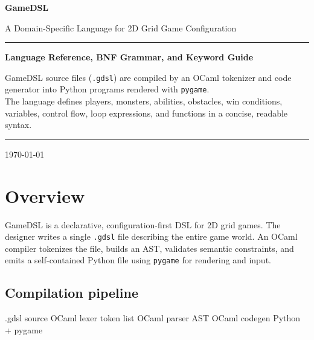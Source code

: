 \documentclass[12pt,a4paper]{article}
\begin{document}

\begin{titlepage}
\centering
\vspace*{2.5cm}
{\Huge\bfseries\color{kw} GameDSL \par}
\vspace{0.4cm}
{\large\color{cmt}
  A Domain-Specific Language for 2D Grid Game Configuration\par}
\vspace{1.8cm}
\rule{0.55\textwidth}{0.4pt}\par
\vspace{1cm}
{\large\bfseries Language Reference, BNF Grammar, and Keyword Guide\par}
\vspace{0.6cm}
{\normalsize
  GameDSL source files (\texttt{.gdsl}) are compiled by an OCaml
  tokenizer and code generator into Python programs rendered
  with \texttt{pygame}.\\[6pt]
  The language defines players, monsters, abilities, obstacles,
  win conditions, variables, control flow, loop expressions,
  and functions in a concise, readable syntax.\par}
\vspace{1.8cm}
\rule{0.55\textwidth}{0.4pt}\par
\vspace{0.8cm}
{\normalsize \today\par}
\vfill
\end{titlepage}

\tableofcontents
\newpage

\section{Overview}

GameDSL is a declarative, configuration-first DSL for 2D grid games.
The designer writes a single \texttt{.gdsl} file describing the entire
game world.  An OCaml compiler tokenizes the file, builds an AST,
validates semantic constraints, and emits a self-contained Python file
using \texttt{pygame} for rendering and input.

\subsection*{Compilation pipeline}
\begin{center}
\ttfamily
.gdsl source \textrightarrow{} OCaml lexer \textrightarrow{}
token list \textrightarrow{} OCaml parser \textrightarrow{}
AST \textrightarrow{} OCaml codegen \textrightarrow{}
Python + pygame
\end{center}
\end{document}
